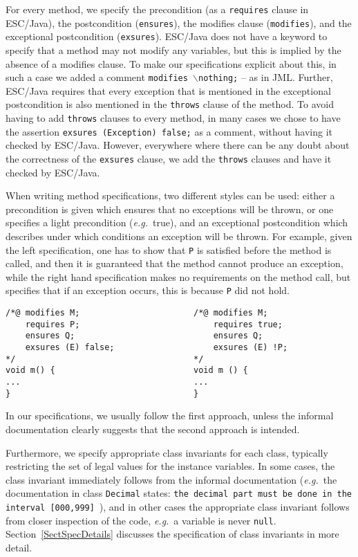 \documentclass[a4paper]{llncs}
\newcommand{\noth}{\(\backslash\)\texttt{nothing}}
\begin{document}
For every method, we specify the precondition (as a \texttt{requires} clause
in ESC/Java), the postcondition (\texttt{ensures}), the modifies
clause (\texttt{modifies}), and the exceptional postcondition
(\texttt{exsures}). ESC/Java does not have a keyword to specify that a
method may not modify any variables, but this is implied by the
absence of a modifies clause. To make our specifications explicit
about this, in such a case we added a comment
\texttt{modifies \noth;} -- as in JML. Further, ESC/Java requires 
that every exception that is mentioned in the exceptional
postcondition is also mentioned in the \texttt{throws} clause of the
method. To avoid having to add \texttt{throws} clauses to every method,
in many cases we chose to have the assertion \texttt{exsures
(Exception) false;} as a comment, without having it checked by
ESC/Java. However, everywhere where there can be any doubt about the
correctness of the \texttt{exsures} clause, we add the \texttt{throws}
clauses and have it checked by ESC/Java.

When writing method specifications, two different styles can be used:
either a precondition is given which ensures that no exceptions
will be thrown, or one specifies a light precondition
(\emph{e.g.}~true), and an exceptional postcondition which describes
under which conditions an exception will be thrown. For example, given
the left specification, one has to show that \texttt{P} is satisfied
before the method is called, and then it is guaranteed that the method
cannot produce an exception, while the right hand specification makes
no requirements on the method call, but specifies that if an exception
occurs, this is because \texttt{P} did not hold.
\begin{verbatim}
/*@ modifies M;                       /*@ modifies M;
    requires P;                           requires true;
    ensures Q;                            ensures Q;
    exsures (E) false;                    exsures (E) !P;
*/                                    */
void m() {                            void m () {
...                                   ...
}                                     }
\end{verbatim}

In our specifications, we usually follow the first approach,
unless the informal documentation clearly suggests that the second
approach is intended.

Furthermore, we specify appropriate class invariants for each class,
typically restricting the set of legal values for the instance
variables. In some cases, the class invariant immediately follows from
the informal documentation (\emph{e.g.}~the documentation in class
\texttt{Decimal} states:
\texttt{the decimal part must be done in the interval 
[000,999]}~\cite{PurseUrl}), and in other cases the appropriate class
invariant follows from closer inspection of the code, \emph{e.g.}~a
variable is never \texttt{null}.  Section~\ref{SectSpecDetails}
discusses the specification of class invariants in more detail.
\end{document}
